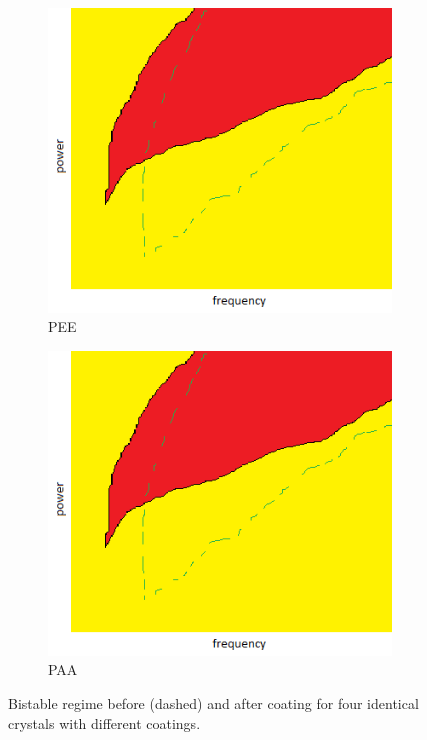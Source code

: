 \begin{figure}
	  \begin{subfigure}[b]{0.4\textwidth}
		\includegraphics[width=\textwidth]{figures/hysteresis_regime_coated.png}
		\caption{PEE}
		\label{fig:rPEE}
  \end{subfigure}
	  \begin{subfigure}[b]{0.4\textwidth}
		\includegraphics[width=\textwidth]{figures/hysteresis_regime_coated.png}
		\caption{PAA}
		\label{fig:rPAA}
  \end{subfigure}
	
	\caption{Bistable regime before (dashed) and after coating for four identical crystals with different coatings. }
	\label{fig:hysteresis_regime_coated}
\end{figure}


